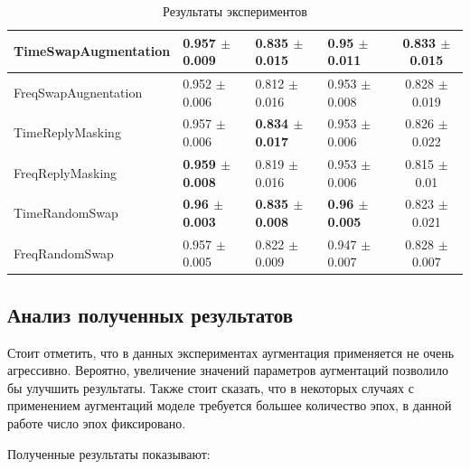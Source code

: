 \documentclass[12pt, fleqn]{article}
\begin{document}
\begin{table}[h]
\begin{tabular}{ | l | l | l | l | c |}
			TimeSwapAugmentation & 0.957 $\pm$ 0.009  & \textbf{0.835 $\pm$ 0.015} & 0.95 $\pm$ 0.011 & \textbf{0.833 $\pm$ 0.015} \\ \hline
			FreqSwapAugnentation & 0.952 $\pm$ 0.006  & 0.812 $\pm$ 0.016 & 0.953 $\pm$ 0.008 & 0.828 $\pm$ 0.019\\ \hline
			TimeReplyMasking & 0.957 $\pm$ 0.006  & \textbf{0.834 $\pm$ 0.017} & 0.953 $\pm$ 0.006 & 0.826 $\pm$ 0.022 \\ \hline
			FreqReplyMasking & \textbf{0.959 $\pm$ 0.008}  & 0.819 $\pm$ 0.016 & 0.953 $\pm$ 0.006 & 0.815 $\pm$ 0.01 \\ \hline
			TimeRandomSwap & \textbf{0.96 $\pm$ 0.003}  & \textbf{0.835 $\pm$ 0.008} & \textbf{0.96 $\pm$ 0.005} & 0.823 $\pm$ 0.021 \\ \hline
			FreqRandomSwap & 0.957 $\pm$ 0.005 & 0.822 $\pm$ 0.009 & 0.947 $\pm$ 0.007 & 0.828 $\pm$ 0.007 \\
			\hline
		\end{tabular}
		\caption{Результаты экспериментов}
		\label{table:t1}
	\end{table}
	\subsection{Анализ полученных результатов}
	
	Стоит отметить, что в данных экспериментах аугментация применяется не очень агрессивно. Вероятно, увеличение значений параметров аугментаций позволило бы улучшить результаты. Также стоит сказать, что в некоторых случаях с применением аугментаций моделе требуется большее количество эпох, в данной работе число эпох фиксировано.
	
	Полученные результаты показывают:
	
\end{document}
